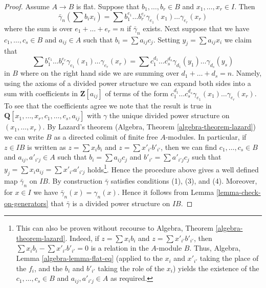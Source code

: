 \begin{proof}
\medskip\noindent
Assume $A \to B$ is flat. Suppose that $b_1, \ldots, b_r \in B$ and
$x_1, \ldots, x_r \in I$. Then
$$
\bar\gamma_n(\sum b_ix_i) =
\sum b_1^{e_1} \ldots b_r^{e_r} \gamma_{e_1}(x_1) \ldots \gamma_{e_r}(x_r)
$$
where the sum is over $e_1 + \ldots + e_r = n$
if $\bar\gamma_n$ exists. Next suppose that we have $c_1, \ldots, c_s \in B$
and $a_{ij} \in A$ such that $b_i = \sum a_{ij}c_j$.
Setting $y_j = \sum a_{ij}x_i$ we claim that
$$
\sum b_1^{e_1} \ldots b_r^{e_r} \gamma_{e_1}(x_1) \ldots \gamma_{e_r}(x_r) =
\sum c_1^{d_1} \ldots c_s^{d_s} \gamma_{d_1}(y_1) \ldots \gamma_{d_s}(y_s)
$$
in $B$ where on the right hand side we are summing over
$d_1 + \ldots + d_s = n$. Namely, using the axioms of a divided power
structure we can expand both sides into a sum with coefficients
in $\mathbf{Z}[a_{ij}]$ of terms of the form 
$c_1^{d_1} \ldots c_s^{d_s}\gamma_{e_1}(x_1) \ldots \gamma_{e_r}(x_r)$.
To see that the coefficients agree we note that the result is true
in $\mathbf{Q}[x_1, \ldots, x_r, c_1, \ldots, c_s, a_{ij}]$ with
$\gamma$ the unique divided power structure on $(x_1, \ldots, x_r)$.
By Lazard's theorem (Algebra, Theorem \ref{algebra-theorem-lazard})
we can write $B$ as a directed colimit of finite free $A$-modules.
In particular, if $z \in IB$ is written as $z = \sum x_ib_i$ and
$z = \sum x'_{i'}b'_{i'}$, then we can find $c_1, \ldots, c_s \in B$
and $a_{ij}, a'_{i'j} \in A$ such that $b_i = \sum a_{ij}c_j$
and $b'_{i'} = \sum a'_{i'j}c_j$ such that
$y_j = \sum x_ia_{ij} = \sum x'_{i'}a'_{i'j}$ holds\footnote{This
can also be proven without recourse to
Algebra, Theorem \ref{algebra-theorem-lazard}. Indeed, if
$z = \sum x_ib_i$ and $z = \sum x'_{i'}b'_{i'}$, then
$\sum x_ib_i - \sum x'_{i'}b'_{i'} = 0$ is a relation in the
$A$-module $B$. Thus, Algebra, Lemma \ref{algebra-lemma-flat-eq}
(applied to the $x_i$ and $x'_{i'}$ taking the place of the $f_i$,
and the $b_i$ and $b'_{i'}$ taking the role of the $x_i$) yields
the existence of the $c_1, \ldots, c_s \in B$
and $a_{ij}, a'_{i'j} \in A$ as required.}.
Hence the procedure above gives a well defined map $\bar\gamma_n$
on $IB$. By construction $\bar\gamma$ satisfies conditions (1), (3), and
(4). Moreover, for $x \in I$ we have $\bar\gamma_n(x) = \gamma_n(x)$. Hence
it follows from Lemma \ref{lemma-check-on-generators} that $\bar\gamma$
is a divided power structure on $IB$.
\end{proof}

